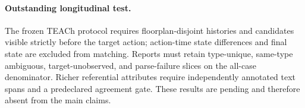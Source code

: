 \documentclass{article}
\begin{document}
\paragraph{Outstanding longitudinal test.}
The frozen TEACh protocol \citep{padmakumar2022teach} requires floorplan-disjoint histories and candidates visible strictly before the target action; action-time state differences and final state are excluded from matching. Reports must retain type-unique, same-type ambiguous, target-unobserved, and parse-failure slices on the all-case denominator. Richer referential attributes require independently annotated text spans and a predeclared agreement gate. These results are pending and therefore absent from the main claims.
\end{document}
